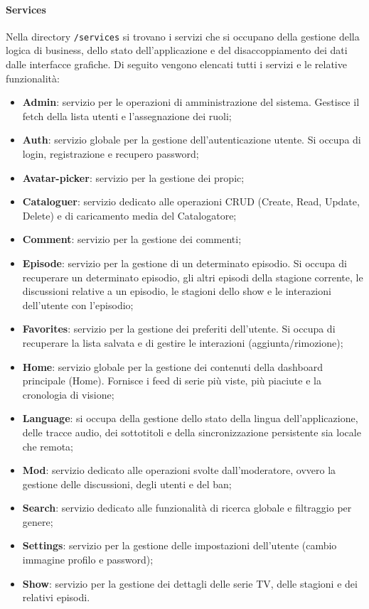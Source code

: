 \documentclass[11pt,a4paper]{article}
\begin{document}
\paragraph{Services}
Nella directory \texttt{/services} si trovano i servizi che si occupano della gestione della logica di business, dello stato dell'applicazione e del disaccoppiamento dei dati dalle interfacce grafiche. Di seguito vengono elencati tutti i servizi e le relative funzionalità:
\begin{itemize}
    \item \textbf{Admin}: servizio per le operazioni di amministrazione del sistema. Gestisce il fetch della lista utenti e l'assegnazione dei ruoli;
    \item \textbf{Auth}: servizio globale per la gestione dell'autenticazione utente. Si occupa di login, registrazione e recupero password;
    \item \textbf{Avatar-picker}: servizio per la gestione dei propic;
    \item \textbf{Cataloguer}: servizio dedicato alle operazioni CRUD (Create, Read, Update, Delete) e di caricamento media del Catalogatore;
    \item \textbf{Comment}: servizio per la gestione dei commenti;
    \item \textbf{Episode}: servizio per la gestione di un determinato episodio. Si occupa di recuperare un determinato episodio, gli altri episodi della stagione corrente, le discussioni relative a un episodio, le stagioni dello show e le interazioni dell’utente con l’episodio;
    \item \textbf{Favorites}: servizio per la gestione dei preferiti dell'utente. Si occupa di recuperare la lista salvata e di gestire le interazioni (aggiunta/rimozione);
    \item \textbf{Home}: servizio globale per la gestione dei contenuti della dashboard principale (Home). Fornisce i feed di serie più viste, più piaciute e la cronologia di visione;
    \item \textbf{Language}: si occupa della gestione dello stato della lingua dell'applicazione, delle tracce audio, dei sottotitoli e della sincronizzazione persistente sia locale che remota;
    \item \textbf{Mod}: servizio dedicato alle operazioni svolte dall'moderatore, ovvero la gestione delle discussioni, degli utenti e del ban;
    \item \textbf{Search}: servizio dedicato alle funzionalità di ricerca globale e filtraggio per genere;
    \item \textbf{Settings}: servizio per la gestione delle impostazioni dell’utente (cambio immagine profilo e password);
    \item \textbf{Show}: servizio per la gestione dei dettagli delle serie TV, delle stagioni e dei relativi episodi.
\end{itemize}
\end{document}
